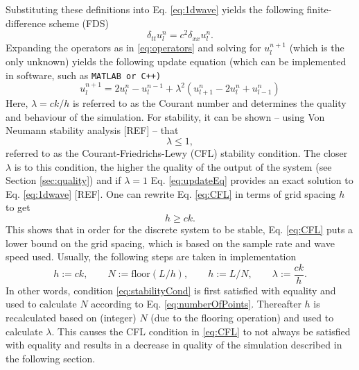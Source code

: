 \documentclass[dvipsnames, preprint]{JASA}
\def\SWcomment[#1]{\textcolor{Bittersweet}{#1}}
\begin{document}
Substituting these definitions into Eq. \eqref{eq:1dwave} yields the following finite-difference scheme (FDS)
\begin{equation}\label{eq:FDS}
    \delta_{tt}u_l^n = c^2 \delta_{xx}u_l^n.
\end{equation}
Expanding the operators as in %
\eqref{eq:operators} and solving for $u_l^{n+1}$ (which is the only unknown) yields the following update equation \SWcomment[(which can be implemented in software, such as {\tt MATLAB} or {\tt C++})]
\begin{equation}\label{eq:updateEq}
    u_l^{n+1} = 2u_l^n-u_l^{n-1} + \lambda^2 \left(u_{l+1}^n-2u_l^n + u_{l-1}^n\right)
\end{equation}
Here, $\lambda = ck/h$ is referred to as the Courant number and determines the quality and behaviour of the simulation. For stability, it can be shown -- using Von Neumann stability analysis [REF] -- that \begin{equation}\label{eq:CFL}
    \lambda \leq 1,
\end{equation}
referred to as the Courant-Friedrichs-Lewy (CFL) stability condition. The closer $\lambda$ is to this condition, the higher the quality of the output of the system (see Section \ref{sec:quality}) and if $\lambda = 1$ Eq. \eqref{eq:updateEq} provides an exact solution to Eq. \eqref{eq:1dwave} %
[REF]. 
One can rewrite Eq. \eqref{eq:CFL} in terms of grid spacing $h$ to get
\begin{equation}\label{eq:stabilityCond}
    h \geq ck.
\end{equation}
This shows that in order for the discrete system to be stable, Eq. \eqref{eq:CFL} puts a lower bound on the grid spacing, which is based on the sample rate and wave speed used. Usually, the following steps are taken in implementation
\begin{equation}\label{eq:orderOfCalcGrid}
    h := ck,\qquad N := \text{floor}(L/h), \qquad h := L/N, \qquad \lambda := \frac{ck}{h}.
\end{equation}
In other words, condition \eqref{eq:stabilityCond} is first satisfied with equality and used to calculate $N$ according to Eq. \eqref{eq:numberOfPoints}. Thereafter $h$ is recalculated based on (integer) $N$ (due to the flooring operation) and used to calculate $\lambda$. This causes the CFL condition in \eqref{eq:CFL} to not always be satisfied with equality and results in a decrease in quality of the simulation described in the following section.
\end{document}
